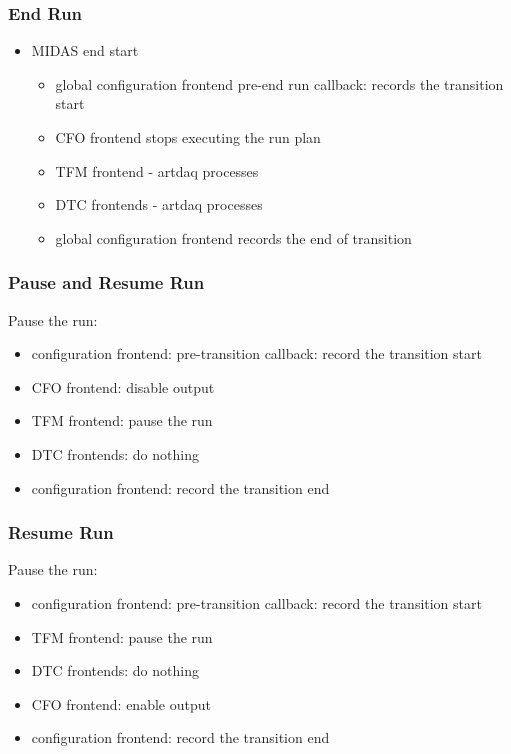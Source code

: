 \subsubsection{End Run}
\begin{itemize}
\item
  MIDAS end start
  \begin{itemize}
  \item
    global configuration frontend pre-end run callback: records
    the transition start
  \item
    CFO frontend stops executing the run plan
  \item
    TFM frontend - artdaq processes
  \item
    DTC frontends - artdaq processes
  \item
    global configuration frontend records the end of transition
  \end{itemize}
\end{itemize}


\subsubsection{Pause and Resume Run}

Pause the run:

\begin{itemize}
\item
  configuration frontend: pre-transition callback: record the transition start
\item
  CFO frontend: disable output 
\item
  TFM frontend: pause the run
\item
  DTC frontends: do nothing 
\item
  configuration frontend: record the transition end
\end{itemize}

\subsubsection{Resume Run}

Pause the run:

\begin{itemize}
\item
  configuration frontend: pre-transition callback: record the transition start
\item
  TFM frontend: pause the run
\item
  DTC frontends: do nothing 
\item
  CFO frontend: enable output 
\item
  configuration frontend: record the transition end
\end{itemize}

